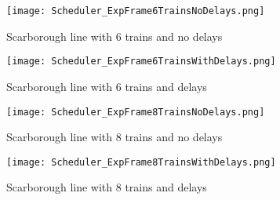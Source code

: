 \begin{figure}[tb]
	\centering
	\texttt{[image: Scheduler\_ExpFrame6TrainsNoDelays.png]}
	\caption{Scarborough line with 6 trains and no delays}\label{fig:6trainsNoDelay}
\end{figure}

\begin{figure}[tb]
	\centering
	\texttt{[image: Scheduler\_ExpFrame6TrainsWithDelays.png]}
	\caption{Scarborough line with 6 trains and delays}\label{fig:6trainsWithDelay}
\end{figure}

\begin{figure}[tb]
	\centering
	\texttt{[image: Scheduler\_ExpFrame8TrainsNoDelays.png]}
	\caption{Scarborough line with 8 trains and no delays}\label{fig:8trainsNoDelay}
\end{figure}

\begin{figure}[tb]
	\centering
	\texttt{[image: Scheduler\_ExpFrame8TrainsWithDelays.png]}
	\caption{Scarborough line with 8 trains and delays}\label{fig:8trainsWithDelay}
\end{figure}